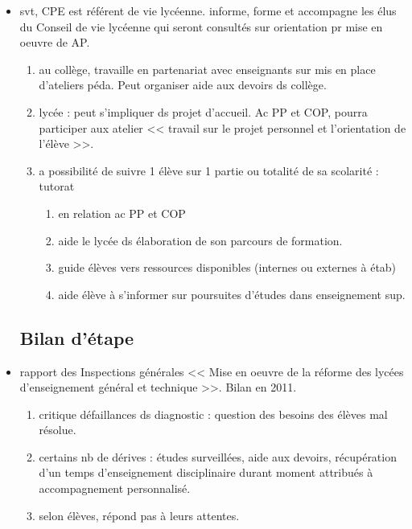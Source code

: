\documentclass[12pt]{report}
\begin{document}
\begin{itemize}
\item svt, CPE est référent de vie lycéenne. informe, forme et accompagne les élus du Conseil de vie lycéenne qui seront consultés sur orientation pr mise en oeuvre de AP.
\begin{enumerate}
\item au collège, travaille en partenariat avec enseignants sur mis en place d'ateliers péda. Peut organiser aide aux devoirs ds collège. \\
\item lycée : peut s'impliquer ds projet d'accueil. Ac PP et COP, pourra participer aux atelier << travail sur le projet personnel et l'orientation de l'élève >>. \\
\item a possibilité de suivre 1 élève sur 1 partie ou totalité de sa scolarité : tutorat
\begin{enumerate}
\item en relation ac PP et COP \\
 \item aide le lycée ds élaboration de son parcours de formation. \\
 \item guide élèves vers ressources disponibles (internes ou externes à étab)
 \item aide élève à s'informer sur poursuites d'études dans enseignement sup. \\
\end{enumerate}
\end{enumerate}


\subsection{Bilan d'étape}

\item rapport des Inspections générales << Mise en oeuvre de la réforme des lycées d'enseignement général et technique >>. Bilan en 2011.\\
\begin{enumerate}
\item critique défaillances ds diagnostic : question des besoins des élèves mal résolue. \\
\item certains nb de dérives : études surveillées, aide aux devoirs, récupération d'un temps d'enseignement disciplinaire durant moment attribués à accompagnement personnalisé. \\
\item selon élèves, répond pas à leurs attentes. \\
\end{enumerate}


\end{itemize}
\end{document}
